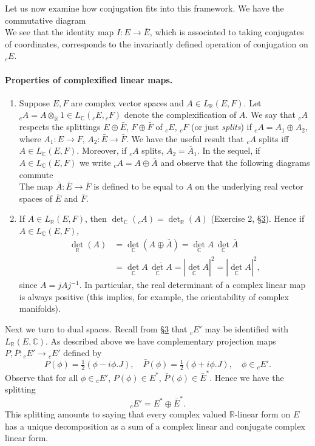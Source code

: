 Let us now examine how conjugation fits into this framework. We have the commutative diagram
\[

\]
We see that the identity map $I:E\to\bar E$, which is associated to taking conjugates of coordinates, corresponds to the invariantly defined operation of conjugation on ${}_cE$.
\paragraph{Properties of complexified linear maps.}
\begin{enumerate}
\item Suppose $E,F$ are complex vector spaces and $A\in L_{\mathbb R}(E,F)$. Let ${}_cA=A\otimes_{\mathbb R}1\in L_{\mathbb C}({}_cE,{}_cF)$ denote the complexification of $A$. We say that ${}_cA$ respects the splittings $E\oplus\bar E$, $F\oplus\bar F$ of ${}_cE$, ${}_cF$ (or just \emph{splits}) if ${}_cA=A_1\oplus A_2$, where $A_1:E\to F$, $A_2:\bar E\to\bar F$. We have the useful result that ${}_cA$ splits iff $A\in L_{\mathbb C}(E,F)$. Moreover, if ${}_cA$ splits, $A_2=\bar A_1$. In the sequel, if $A\in L_{\mathbb C}(E,F)$ we write ${}_cA=A\oplus\bar A$ and observe that the following diagrams commute
\[

\qquad

\]
The map $\bar A:\bar E\to\bar F$ is defined to be equal to $A$ on the underlying real vector spaces of $\bar E$ and $\bar F$.
\item If $A\in L_{\mathbb R}(E,F)$, then $\det_{\mathbb C}({}_cA)=\det_{\mathbb R}(A)$ (Exercise 2, \hyperref[sec:5:3]{\S3}). Hence if $A\in L_{\mathbb C}(E,F)$,
\[
\begin{split}
\det_{\mathbb R}(A)&=\det_{\mathbb C}(A\oplus\bar A)=\det_{\mathbb C}A\,\det_{\mathbb C}\bar A\\
&=\det_{\mathbb C}A\,\overline{\det_{\mathbb C}A}=|\det_{\mathbb C}A|^2=|\det_{\mathbb C}A|^2,
\end{split}
\]
since $A=jAj^{-1}$. In particular, the real determinant of a complex linear map is always positive (this implies, for example, the orientability of complex manifolds).
\end{enumerate}
Next we turn to dual spaces. Recall from \hyperref[sec:5:3]{\S3} that ${}_cE'$ may be identified with $L_{\mathbb R}(E,\mathbb C)$. As described above we have complementary projection maps $P,\bar P:{}_cE'\to{}_cE'$ defined by
\[
P(\phi)=\tfrac12(\phi-i\phi.J),\quad\bar P(\phi)=\tfrac12(\phi+i\phi.J),\quad\phi\in{}_cE'.
\]
Observe that for all $\phi\in{}_cE'$, $P(\phi)\in E^*$, $\bar P(\phi)\in\bar E^*$. Hence we have the splitting
\[
{}_cE'=E^*\oplus\bar E^*.
\]
This splitting amounts to saying that every complex valued $\mathbb R$-linear form on $E$ has a unique decomposition as a sum of a complex linear and conjugate complex linear form.

